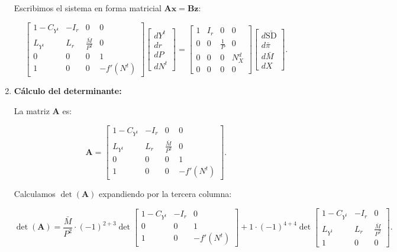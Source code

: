\documentclass[
  doc,
  floatsintext,
  longtable,
  a4paper,
  nolmodern,
  notxfonts,
  notimes,
  colorlinks=true,linkcolor=blue,citecolor=blue,urlcolor=blue]{apa7}
\begin{document}
\begin{enumerate}
  Escribimos el sistema en forma matricial
  \(\mathbf{A} \mathbf{x} = \mathbf{B} \mathbf{z}\):

  \[
  \begin{bmatrix}
  1 - C_{Y^t} & -I_r & 0 & 0 \\
  L_{Y^t} & L_r & \frac{\bar{M}}{P^2} & 0 \\
  0 & 0 & 0 & 1 \\
  1 & 0 & 0 & -f'(N^t)
  \end{bmatrix}
  \begin{bmatrix}
  dY^t \\
  dr \\
  dP \\
  dN^t
  \end{bmatrix}
  =
  \begin{bmatrix}
  1 & I_r & 0 & 0 \\
  0 & 0 & \frac{1}{P} & 0 \\
  0 & 0 & 0 & N^d_X \\
  0 & 0 & 0 & 0
  \end{bmatrix}
  \begin{bmatrix}
  d\bar{\mathrm{SD}} \\
  d\bar{\pi} \\
  d\bar{M} \\
  dX
  \end{bmatrix}.
  \]
\item
  \textbf{Cálculo del determinante:}

  La matriz \(\mathbf{A}\) es:

  \[
  \mathbf{A} = \begin{bmatrix}
  1 - C_{Y^t} & -I_r & 0 & 0 \\
  L_{Y^t} & L_r & \frac{\bar{M}}{P^2} & 0 \\
  0 & 0 & 0 & 1 \\
  1 & 0 & 0 & -f'(N^t)
  \end{bmatrix}.
  \]

  Calculamos \(\det(\mathbf{A})\) expandiendo por la tercera columna:

  \[
  \det(\mathbf{A}) = \frac{\bar{M}}{P^2} \cdot (-1)^{2+3} \det \begin{bmatrix}
  1 - C_{Y^t} & -I_r & 0 \\
  0 & 0 & 1 \\
  1 & 0 & -f'(N^t)
  \end{bmatrix} + 1 \cdot (-1)^{4+4} \det \begin{bmatrix}
  1 - C_{Y^t} & -I_r & 0 \\
  L_{Y^t} & L_r & \frac{\bar{M}}{P^2} \\
  1 & 0 & 0
  \end{bmatrix}.
  \]


\end{enumerate}
\end{document}
